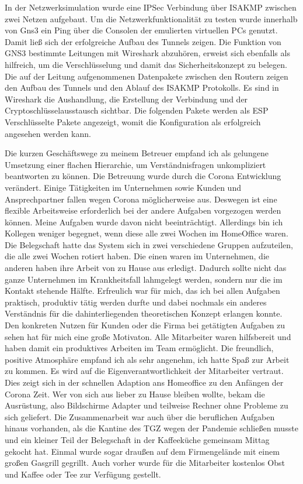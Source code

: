 \documentclass[english,runningheads,a4paper]{llncs}[2018/03/10]
\begin{document}
In der Netzwerksimulation wurde eine IPSec Verbindung über ISAKMP zwischen zwei Netzen aufgebaut. Um die Netzwerkfunktionalität zu testen wurde innerhalb von Gns3 ein Ping über die Consolen der emulierten virtuellen PCs genutzt. Damit ließ sich der erfolgreiche Aufbau des Tunnels zeigen. Die Funktion von GNS3 bestimmte Leitungen mit Wireshark abzuhören, erweist sich ebenfalls als hilfreich, um die Verschlüsselung und damit das Sicherheitskonzept zu belegen. Die auf der Leitung aufgenommenen Datenpakete zwischen den Routern zeigen den Aufbau des Tunnels und den Ablauf des ISAKMP Protokolls. Es sind in Wireshark die Aushandlung, die Erstellung der Verbindung und der Cryptoschlüsselausstausch sichtbar. Die folgenden Pakete werden als ESP Verschlüsselte Pakete angezeigt, womit die Konfiguration als erfolgreich angesehen werden kann.


Die kurzen Geschäftswege zu  meinem Betreuer empfand ich als gelungene Umsetzung einer flachen Hierarchie, um Verständnisfragen unkompliziert beantworten zu können. Die Betreuung wurde durch die Corona Entwicklung verändert. Einige Tätigkeiten im Unternehmen sowie Kunden und Ansprechpartner fallen wegen Corona möglicherweise aus. Deswegen ist eine flexible Arbeitsweise erforderlich bei der andere Aufgaben vorgezogen werden können.  Meine Aufgaben wurde davon nicht beeinträchtigt. Allerdings bin ich Kollegen weniger begegnet, wenn diese alle zwei Wochen im HomeOffice waren. Die Belegschaft hatte das System sich in zwei verschiedene Gruppen aufzuteilen, die alle zwei Wochen rotiert haben. Die einen waren im Unternehmen, die anderen haben ihre Arbeit von zu Hause aus erledigt. Dadurch sollte nicht das ganze Unternehmen im Krankheitsfall lahmgelegt werden, sondern nur die im Kontakt stehende Hälfte. 
Erfreulich war für mich, das ich bei allen Aufgaben praktisch, produktiv tätig werden durfte und dabei nochmals ein anderes Verständnis für die dahinterliegenden theoretischen Konzept erlangen konnte. Den konkreten Nutzen für Kunden oder die Firma bei getätigten Aufgaben zu sehen hat für mich eine große Motivaton. Alle Mitarbeiter waren hilfsbereit und haben damit ein produktives Arbeiten im Team ermöglicht.
Die freundlich, positive Atmosphäre empfand ich als sehr angenehm, ich hatte Spaß zur Arbeit zu kommen. Es wird auf die Eigenverantwortlichkeit der Mitarbeiter vertraut. Dies zeigt sich in der schnellen Adaption ans Homeoffice zu den Anfängen der Corona Zeit. Wer von sich aus lieber zu Hause bleiben wollte, bekam die Ausrüstung, also Bildschirme Adapter und teilweise Rechner ohne Probleme zu sich geliefert.
Die Zusammenarbeit war auch über die beruflichen Aufgaben hinaus vorhanden, als die Kantine des TGZ wegen der Pandemie schließen musste und ein kleiner Teil der Belegschaft in der Kaffeeküche gemeinsam Mittag gekocht hat. Einmal wurde sogar draußen auf dem Firmengelände mit einem großen Gasgrill gegrillt. Auch vorher wurde für die Mitarbeiter kostenlos Obst und Kaffee oder Tee zur Verfügung gestellt. 
\end{document}
